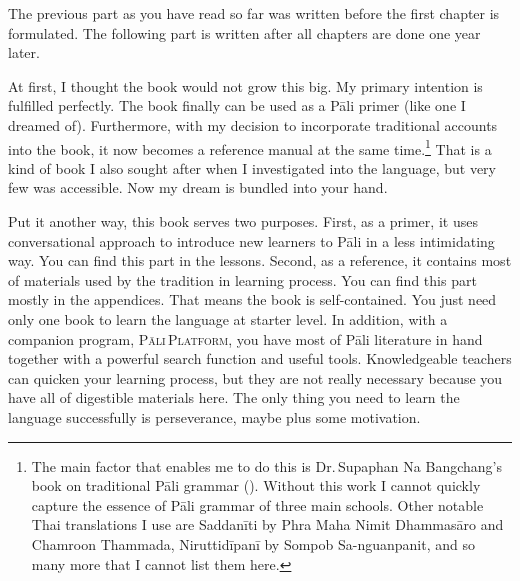 \bigskip
The previous part as you have read so far was written before the first chapter is formulated. The following part is written after all chapters are done one year later.

At first, I thought the book would not grow this big. My primary intention is fulfilled perfectly. The book finally can be used as a P\=ali primer (like one I dreamed of). Furthermore, with my decision to incorporate traditional accounts into the book, it now becomes a reference manual at the same time.\footnote{The main factor that enables me to do this is Dr.\,Supaphan Na Bangchang's book on traditional P\=ali grammar (\citealp{supaphan:pali}). Without this work I cannot quickly capture the essence of P\=ali grammar of three main schools. Other notable Thai translations I use are Saddan\=iti by Phra Maha Nimit Dhammas\=aro and Chamroon Thammada, Niruttid\=ipan\=i by Sompob Sa-nguanpanit, and so many more that I cannot list them here.} That is a kind of book I also sought after when I investigated into the language, but very few was accessible. Now my dream is bundled into your hand.

Put it another way, this book serves two purposes. First, as a primer, it uses conversational approach to introduce new learners to P\=ali in a less intimidating way. You can find this part in the lessons. Second, as a reference, it contains most of materials used by the tradition in learning process. You can find this part mostly in the appendices. That means the book is self-contained. You just need only one book to learn the language at starter level. In addition, with a companion program, \textsc{P\=ali\,Platform}, you have most of P\=ali literature in hand together with a powerful search function and useful tools. Knowledgeable teachers can quicken your learning process, but they are not really necessary because you have all of digestible materials here. The only thing you need to learn the language successfully is perseverance, maybe plus some motivation.

